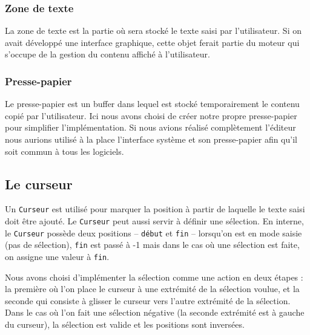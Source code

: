\documentclass[french]{article}
\begin{document}
\subsubsection{Zone de texte}\label{ssec:zone-texte}

La zone de texte est la partie où sera stocké le texte saisi par l'utilisateur. Si on avait développé une interface graphique, cette objet ferait partie du moteur qui s'occupe de la gestion du  contenu affiché à l'utilisateur.

\subsubsection{Presse-papier}

Le presse-papier est un buffer dans lequel est stocké temporairement le contenu copié par l'utilisateur. Ici nous avons choisi de créer notre propre presse-papier pour simplifier l'implémentation. Si nous avions réalisé complètement l'éditeur nous aurions utilisé à la place l'interface système et son presse-papier afin qu'il soit commun à tous les logiciels.

\subsection{Le curseur}\label{ssec:curseur}
Un \texttt{Curseur} est utilisé pour marquer la position à partir de laquelle le texte saisi doit être ajouté. Le \texttt{Curseur} peut aussi servir à définir une sélection. En interne, le \texttt{Curseur} possède deux positions -- \texttt{début} et \texttt{fin} -- lorsqu'on est en \og{}mode saisie\fg{} (pas de sélection), \texttt{fin} est passé à -1 mais dans le cas où une sélection est faite, on assigne une valeur à \texttt{fin}.

Nous avons choisi d'implémenter la sélection comme une action en deux étapes : la première où l'on place le curseur à une extrémité de la sélection voulue, et la seconde qui consiste à glisser le curseur vers l'autre extrémité de la sélection. Dans le cas où l'on fait une sélection \og{}négative\fg{} (la seconde extrémité est à gauche du curseur), la sélection est valide et les positions sont inversées.
\end{document}
